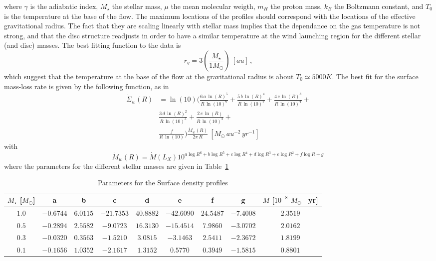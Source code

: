 \documentclass{aa}
\begin{document}
where $\gamma$ is the adiabatic index, $M_\star$ the stellar mass, $\mu$ the mean molecular weigth, $m_H$ the proton mass, $k_B$ the Boltzmann constant, and $T_0$ is the temperature at the base of the flow.
The maximum locations of the profiles should correspond with the locations of the effective gravitational radius. The fact that they are scaling linearly with stellar mass implies that the dependance on the gas temperature is not strong, and that the disc structure readjusts in order to have a similar temperature at the wind launching region for the different stellar (and disc) masses.
The best fitting function to the data is
\begin{equation}\label{eq:rg_sim}
  r_g = 3 \left(\frac{M_\star}{1 M_\odot}\right) \ [au]\,,
\end{equation}
which suggest that the temperature at the base of the flow at the gravitational radius is about $T_0 \simeq 5000 K$.
The best fit for the surface mass-loss rate is given by the following function, as in 
\begin{eqnarray}
  \dot{\Sigma}_w(R) &= \ln{(10)} \bigg(\frac{6\, a\, \ln{(R)}^5}{R\, \ln{(10)}^6} +
  \frac{5\, b\, \ln{(R)}^4}{R\, \ln{(10)}^5} +
  \frac{4\, c\, \ln{(R)}^3}{R\, \ln{(10)}^4} + \\ \nonumber
  &\frac{3\, d\, \ln{(R)}^2}{R\, \ln{(10)}^3} +
  \frac{2\, e\, \ln{(R)}}{R\, \ln{(10)}^2} + \\ \nonumber
  &\frac{f}{R\, \ln{(10)}}\bigg)
  \frac{\dot{M}_w(R)}{2\pi\, R} \ [M_\odot\, {au}^{-2}\, {yr}^{-1}]\,
\end{eqnarray}
with
\begin{equation}
  \dot{M}_w(R) = \dot{M}(L_X) 10^{a\log{R}^6 + b\log{R}^5 + c\log{R}^4 + d\log{R}^3 + e\log{R}^2 + f\log{R} + g}\,
\end{equation}
where the parameters for the different stellar masses are given in Table~\ref{tab:fit}
\begin{table}
\caption{Parameters for the Surface density profiles}
\label{tab:fit}
\centering
\begin{tabular}{c c c c c c c c c}
\hline
$M_\star$ [$M_\odot$] & a & b & c & d & e & f & g & $\dot{M}$ [$10^{-8}$ $M_\odot$ \ yr]\\
\hline
\hline
   $1.0$ & $-0.6744$ & $6.0115$ & $-21.7353$ & $40.8882$ & $-42.6090$ & $24.5487$ & $-7.4008$ & $2.3519$\\
   $0.5$ & $-0.2894$ & $2.5582$ & $-9.0723$ & $16.3130$ & $-15.4514$ & $7.9860$ & $-3.0702$ & $2.0162$\\
   $0.3$ & $-0.0320$ & $0.3563$ & $-1.5210$ & $3.0815$ & $-3.1463$ & $2.5411$ & $-2.3672$ & $1.8199$\\
   $0.1$ & $-0.1656$ & $1.0352$ & $-2.1617$ & $1.3152$ & $0.5770$ & $0.3949$ & $-1.5815$ & $0.8801$\\
\hline
\end{tabular}
\end{table}
\end{document}
